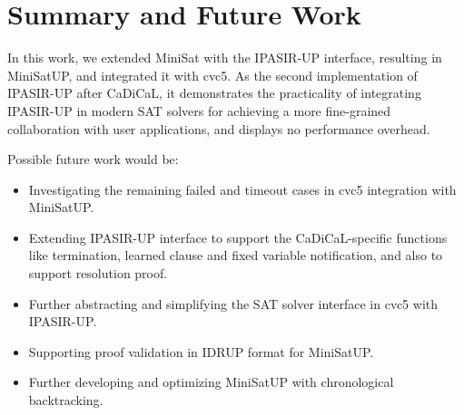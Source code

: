 \chapter{Summary and Future Work}

In this work, we extended MiniSat with the IPASIR-UP interface, resulting in MiniSatUP, and integrated it with cvc5. As the second implementation of IPASIR-UP after CaDiCaL, it demonstrates the practicality of integrating IPASIR-UP in modern SAT solvers for achieving a more fine-grained collaboration with user applications, and displays no performance overhead.

Possible future work would be:

\begin{itemize}
  \item Investigating the remaining failed and timeout cases in cvc5 integration with MiniSatUP.
  \item Extending IPASIR-UP interface to support the CaDiCaL-specific functions like termination, learned clause and fixed variable notification, and also to support resolution proof.
  \item Further abstracting and simplifying the SAT solver interface in cvc5 with IPASIR-UP.
  \item Supporting proof validation in IDRUP format for MiniSatUP.
  \item Further developing and optimizing MiniSatUP with chronological backtracking.
\end{itemize}
